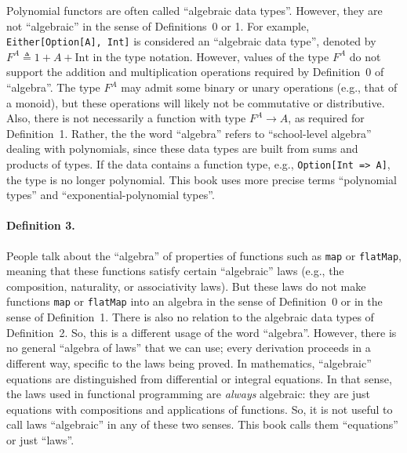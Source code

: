 Polynomial functors are often called \textquotedblleft algebraic data
types\textquotedblright . However, they are not \textquotedblleft algebraic\textquotedblright{}
in the sense of Definitions~0 or 1. For example, \lstinline!Either[Option[A], Int]!
is considered an \textquotedblleft algebraic data type\textquotedblright ,
denoted by $F^{A}\triangleq1+A+\text{Int}$ in the type notation.
However, values of the type $F^{A}$ do not support the addition and
multiplication operations required by Definition~0 of \textsf{``}algebra\textsf{''}.
The type $F^{A}$ may admit some binary or unary operations (e.g.,
that of a monoid), but these operations will likely not be commutative
or distributive. Also, there is not necessarily a function with type
$F^{A}\rightarrow A$, as required for Definition~1. Rather, the
the word \textsf{``}algebra\textsf{''} refers to \textsf{``}school-level algebra\textsf{''} dealing
with polynomials, since these data types are built from sums and products
of types. If the data contains a function type, e.g., \lstinline!Option[Int => A]!,
the type is no longer polynomial. This book uses more precise terms
\textquotedblleft polynomial types\textquotedblright{} and \textquotedblleft exponential-polynomial
types\textquotedblright .

\paragraph{Definition 3.}

People talk about the \textquotedblleft algebra\textquotedblright{}
of properties of functions such as \lstinline!map! or \lstinline!flatMap!,
meaning that these functions satisfy certain \textsf{``}algebraic\textsf{''} laws
(e.g., the composition, naturality, or associativity laws). But these
laws do not make functions \lstinline!map! or \lstinline!flatMap!
into an algebra in the sense of Definition~0 or in the sense of Definition~1.
There is also no relation to the algebraic data types of Definition~2.
So, this is a different usage of the word \textsf{``}algebra\textsf{''}. However,
there is no general \textsf{``}algebra of laws\textsf{''} that we can use; every derivation
proceeds in a different way, specific to the laws being proved. In
mathematics, \textsf{``}algebraic\textsf{''} equations are distinguished from differential
or integral equations. In that sense, the laws used in functional
programming are \emph{always} algebraic: they are just equations with
compositions and applications of functions. So, it is not useful to
call laws \textsf{``}algebraic\textsf{''} in any of these two senses. This book calls
them \textsf{``}equations\textsf{''} or just \textsf{``}laws\textsf{''}.

